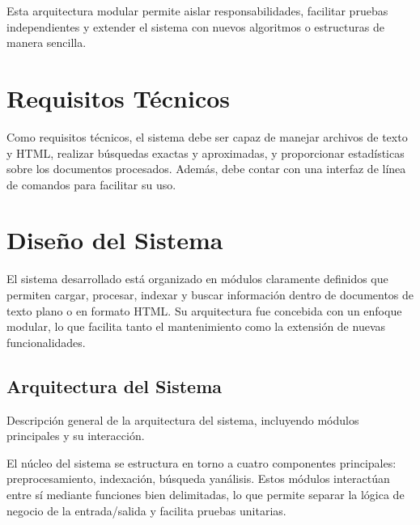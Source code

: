 \documentclass[9pt,letterpaper,onecolumn]{rho-class/rho}
\begin{document}
Esta arquitectura modular permite aislar responsabilidades, facilitar pruebas independientes y extender el sistema con nuevos algoritmos o estructuras de manera sencilla.


\section{Requisitos Técnicos}
Como requisitos técnicos, el sistema debe ser capaz de manejar archivos de texto y HTML, realizar búsquedas exactas y aproximadas, y proporcionar estadísticas sobre los documentos procesados. Además, debe contar con una interfaz de línea de comandos para facilitar su uso.


\section{Diseño del Sistema}
\label{sec:diseno}

El sistema desarrollado está organizado en módulos claramente definidos que permiten cargar, procesar, indexar y buscar información dentro de documentos de texto plano o en formato HTML. Su arquitectura fue concebida con un enfoque modular, lo que facilita tanto el mantenimiento como la extensión de nuevas funcionalidades.

\subsection{Arquitectura del Sistema}
Descripción general de la arquitectura del sistema, incluyendo módulos principales y su interacción.

El núcleo del sistema se estructura en torno a cuatro componentes principales: preprocesamiento, indexación, búsqueda yanálisis. Estos módulos interactúan entre sí mediante funciones bien delimitadas, lo que permite separar la lógica de negocio de la entrada/salida y facilita pruebas unitarias.
\end{document}
